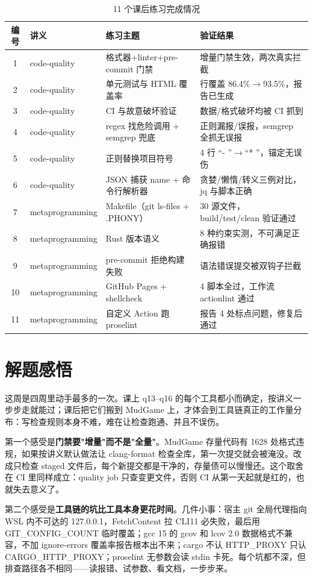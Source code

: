 \documentclass[UTF8]{ctexart}
\begin{document}
\begin{table}[htbp]
\centering
\caption{11 个课后练习完成情况}
\label{tab:homework}
\begin{tabular}{clll}
\toprule
编号 & 讲义 & 练习主题 & 验证结果 \\
\midrule
1 & code-quality & 格式器+linter+pre-commit 门禁 & 增量门禁生效，两次真实拦截 \\
2 & code-quality & 单元测试与 HTML 覆盖率 & 行覆盖 86.4\%$\to$93.5\%，报告已生成 \\
3 & code-quality & CI 与故意破坏验证 & 数据/格式破坏均被 CI 抓到 \\
4 & code-quality & regex 找危险调用 + semgrep 兜底 & 正则漏报/误报，semgrep 全抓无误报 \\
5 & code-quality & 正则替换项目符号 & 4 行 ``- ''$\to$``* ''，锚定无误伤 \\
6 & code-quality & JSON 捕获 name + 命令行解析器 & 贪婪/懒惰/转义三例对比，jq 与脚本正确 \\
7 & metaprogramming & Makefile（git ls-files + .PHONY） & 30 源文件，build/test/clean 验证通过 \\
8 & metaprogramming & Rust 版本语义 & 8 种约束实测，不可满足正确报错 \\
9 & metaprogramming & pre-commit 拒绝构建失败 & 语法错误提交被双钩子拦截 \\
10 & metaprogramming & GitHub Pages + shellcheck & 4 脚本全过，工作流 actionlint 通过 \\
11 & metaprogramming & 自定义 Action 跑 proselint & 报告 4 处标点问题，修复后通过 \\
\bottomrule
\end{tabular}
\end{table}

\section{解题感悟}

这周是四周里动手最多的一次。课上 q13--q16 的每个工具都小而确定，按讲义一步步走就能过；课后把它们搬到 MudGame 上，才体会到工具链真正的工作量分布：写检查规则本身不难，难在让检查跑通、并且不误伤。

第一个感受是\textbf{门禁要"增量"而不是"全量"}。MudGame 存量代码有 1628 处格式违规，如果按讲义默认做法让 clang-format 检查全库，第一次提交就会被淹没。改成只检查 staged 文件后，每个新提交都是干净的，存量债可以慢慢还。这个取舍在 CI 里同样成立：quality job 只查变更文件，否则 CI 从第一天起就是红的，也就失去意义了。

第二个感受是\textbf{工具链的坑比工具本身更花时间}。几件小事：宿主 git 全局代理指向 WSL 内不可达的 127.0.0.1，FetchContent 拉 CLI11 必失败，最后用 GIT\_CONFIG\_COUNT 临时覆盖；gcc 15 的 gcov 和 lcov 2.0 数据格式不兼容，不加 ignore-errors 覆盖率报告根本出不来；cargo 不认 HTTP\_PROXY 只认 CARGO\_HTTP\_PROXY；proselint 无参数会读 stdin 卡死。每个坑都不深，但排查路径各不相同——读报错、试参数、看文档，一步步来。
\end{document}
